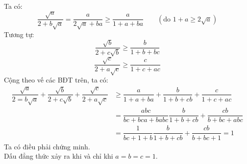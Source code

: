 \lgi
Ta có:
$$\dfrac{\sqrt{a}}{2+b\sqrt{a}}= \dfrac{a}{2\sqrt{a}+ba}\geq \dfrac{a}{1+a+ba} \quad\quad (\text{do } 1+a\geq 2\sqrt{a})$$
Tương tự:
$$\dfrac{\sqrt{b}}{2+c\sqrt{b}}\geq \dfrac{b}{1+b+bc}$$
$$\dfrac{\sqrt{c}}{2+a\sqrt{c}}\geq \dfrac{c}{1+c+ac}$$
Cộng theo vế các BĐT trên, ta có:
\begin{align*}
\dfrac{\sqrt{a}}{2=b\sqrt{a}}+\dfrac{\sqrt{b}}{2+c\sqrt{b}}+\dfrac{\sqrt{c}}{2+a\sqrt{c}} & \geq \dfrac{a}{1+a+ba}+\dfrac{b}{1+b+cb}+\dfrac{c}{1+c+ac}\\
& = \dfrac{abc}{bc+bca+babc}\dfrac{b}{1+b+cb}+\dfrac{cb}{b+bc+abc}\\
& = \dfrac{1}{bc+1+b}\dfrac{b}{1+b+cb}+\dfrac{cb}{b+bc+1}=1
\end{align*}
Ta có điều phải chứng minh. \\
Dấu đẳng thức xảy ra khi và chỉ khi $a=b=c=1$.

